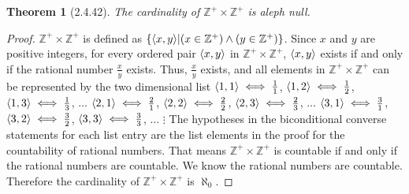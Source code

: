\documentclass[a4paper, 12pt]{article}
\theoremstyle{plain}
\newtheorem*{theorem*}{Theorem}
\DeclarePairedDelimiter{\ord}{\langle}{\rangle}
\begin{document}
	
	\begin{theorem*}[2.4.42]
		The cardinality of $\mathbb{Z^{+}} \times \mathbb{Z^{+}}$ is aleph null.
	\end{theorem*}
	
	\begin{proof}
		$\mathbb{Z^{+}} \times \mathbb{Z^{+}}$ is defined as $\{\ord{x, y} | (x \in \mathbb{Z^{+}}) \land (y \in \mathbb{Z^{+}})\}$. Since $x$ and $y$ are positive integers, for every ordered pair $\ord{x, y}$ in $\mathbb{Z^{+}} \times \mathbb{Z^{+}}$, $\ord{x, y}$ exists if and only if the rational number $\frac{x}{y}$ exists. Thus, $\frac{x}{y}$ exists, and all elements in $\mathbb{Z^{+}} \times \mathbb{Z^{+}}$ can be represented by the two dimensional list
		\newline \indent $\ord{1,1} \iff \frac{1}{1}$, $\ord{1,2} \iff \frac{1}{2}$, $\ord{1,3} \iff \frac{1}{3}$, $\dots$
		\newline \indent $\ord{2,1} \iff \frac{2}{1}$, $\ord{2,2} \iff \frac{2}{2}$, $\ord{2,3} \iff \frac{2}{3}$, $\dots$
		\newline \indent $\ord{3,1} \iff \frac{3}{1}$, $\ord{3,2} \iff \frac{3}{2}$, $\ord{3, 3} \iff \frac{3}{3}$, $\dots$
		\newline \indent \indent $\vdots$
		\newline 
		The hypotheses in the biconditional converse statements for each list entry are the list elements in the proof for the countability of rational numbers. That means $\mathbb{Z^{+}} \times \mathbb{Z^{+}}$ is countable if and only if the rational numbers are countable. We know the rational numbers are countable. Therefore the cardinality of $\mathbb{Z^{+}} \times \mathbb{Z^{+}}$ is $\aleph_0$.
	\end{proof}
\end{document}
